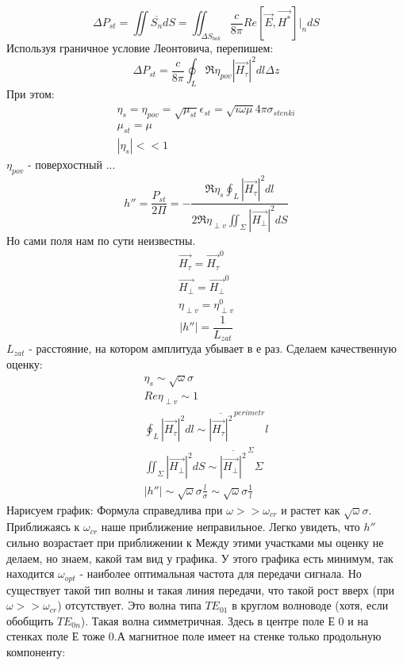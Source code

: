 \begin{enumerate}
	\begin{equation}
		\Delta{P_{st}} = \iint{\overline{S_n}} dS = \iint_{\Delta{S_{bok}}}{\frac{c}{8 \pi} Re[\vec{E}, \vec{H^*}]\vert_n} dS
	\end{equation}
	Используя граничное условие Леонтовича, перепишем:
	\begin{equation}
		\Delta{P_{st}} = \frac{c}{8 \pi} \oint_L \Re{\eta_{pov}} |\vec{H_{\tau}}|^2 dl \Delta{z}
	\end{equation}
	При этом:
	\begin{gather}
		\eta_{s} = \eta_{pov} = \sqrt{\mu_{st}}{\epsilon_{st}} = \sqrt{i \omega \mu}{4 \pi \sigma_{stenki}}\\
		\mu_{st} = \mu\\
		|\eta_{s}| << 1
	\end{gather}
	$\eta_{pov}$ - поверхостный ...
	\begin{equation}
		h'' = \frac{P_{st}}{ 2 \Pi} = 
		- \frac{\Re{\eta_{s}} \oint_L{|\vec{H_{\tau}}|^2} dl}{2 \Re{\eta_{\perp v}} \iint_\Sigma |\vec{H_{\perp}}|^2dS}
	\end{equation}
	Но сами поля нам по сути неизвестны.
	\begin{gather}
		\vec{H_{\tau}} = \vec{H_{\tau}}^{0}\\
		\vec{H_{\perp}} = \vec{H_{\perp}}^0\\
		\eta_{\perp v} = \eta_{\perp v}^0
	\end{gather}
	\begin{equation}
		|h''| = \frac{1}{L_{zat}}
	\end{equation}
	$L_{zat}$ - расстояние, на котором амплитуда убывает в е раз.
	Сделаем качественную оценку:
	\begin{gather}
		\eta_{s} \sim \sqrt{\omega}{\sigma}\\
		Re{\eta_{\perp v}} \sim 1\\
		\oint_L{|\vec{H_{\tau}}|^2} dl \sim 
			\overline{|\vec{H_{\tau}}|^2}^{\,perimetr} l\\
		\iint_\Sigma |\vec{H_{\perp}}|^2 dS \sim \overline{|\vec{H_{\perp}}|^2}^{\, \Sigma} \Sigma\\
		|h''| \sim {\sqrt{\omega}{\sigma} \frac{l}{\sigma}} \sim{\sqrt{\omega}{\sigma} \frac{1}{l}}
	\end{gather}
	Нарисуем график:
	 Формула справедлива при $\omega >> \omega_{cr}$  и растет как $\sqrt{\omega}{\sigma}$.
	 Приближаясь к $\omega_{cr}$ наше приближение неправильное.
	 Легко увидеть, что $h''$ сильно возрастает при приближении к 
	 Между этими участками мы оценку не делаем, но знаем, какой там вид у графика.
	 У этого графика есть минимум, так находится $\omega_{opt}$ - наиболее оптимальная частота для передачи сигнала. Но существует такой тип волны и такая линия передачи, что такой рост вверх (при $\omega >> \omega_{cr}$) отсутствует. Это волна типа $TE_{01}$ в круглом волноводе (хотя, если обобщить $TE_{0 n}$).
	 Такая волна симметричная. Здесь в центре поле Е 0 и на стенках поле Е тоже 0.А магнитное поле имеет на стенке только продольную компоненту:


\end{enumerate}
